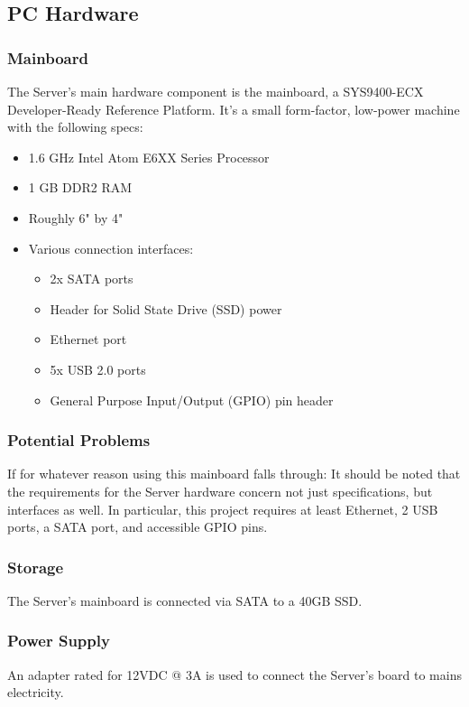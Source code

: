 
\subsection{PC Hardware}

\subsubsection{Mainboard}
The Server's main hardware component is the mainboard, a SYS9400-ECX Developer-Ready Reference Platform. 
It's a small form-factor, low-power machine with the following specs:

\begin{itemize}
	\item 1.6 GHz Intel Atom E6XX Series Processor
	\item 1 GB DDR2 RAM
	\item Roughly 6" by 4"
	\item Various connection interfaces:
	\begin{itemize}
		\item 2x SATA ports
		\item Header for Solid State Drive (SSD) power
		\item Ethernet port
		\item 5x USB 2.0 ports
		\item General Purpose Input/Output (GPIO) pin header
	\end{itemize}
\end{itemize}

\subsubsection{Potential Problems}
If for whatever reason using this mainboard falls through: 
It should be noted that the requirements for the Server hardware concern not just specifications, but interfaces as well.
In particular, this project requires at least Ethernet, 2 USB ports, a SATA port, and accessible GPIO pins.
\subsubsection{Storage}
The Server's mainboard is connected via SATA to a 40GB SSD.

\subsubsection{Power Supply}
An adapter rated for 12VDC @ 3A is used to connect the Server's board to mains electricity.
